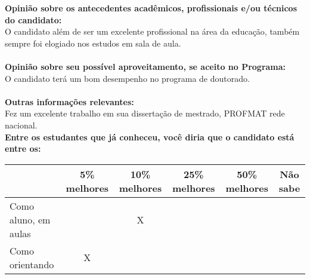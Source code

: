 \documentclass[11pt]{article}
\begin{document}
\textbf{Opinião sobre os antecedentes acadêmicos, profissionais e/ou técnicos do candidato:}
\\O candidato além de ser um excelente profissional na área da educação, também sempre foi elogiado nos estudos em sala de aula.\\
\\
\textbf{Opinião sobre seu possível aproveitamento, se aceito no Programa:}
\\O candidato terá um bom desempenho no programa de doutorado.\\ 
\\
\textbf{Outras informações relevantes:} \\Fez um excelente trabalho em sua dissertação de mestrado, PROFMAT  rede nacional.
\\[0.3cm]
\textbf{Entre os estudantes que já conheceu, você diria que o candidato está entre os:}
\\
\begin{tabular}{|l|c|c|c|c|c|}
\hline
 & 5\% melhores & 10\% melhores & 25\% melhores & 50\% melhores & Não sabe \\
\hline
Como aluno, em aulas &  & X &  &  & \\
\hline
Como orientando & X &  &  &  & \\
\hline
\end{tabular}
\end{document}
